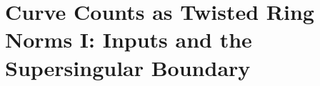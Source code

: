 
\section{Curve Counts as Twisted Ring Norms I: Inputs and the Supersingular Boundary}
\label{sec:ring-norm-genus-one}

